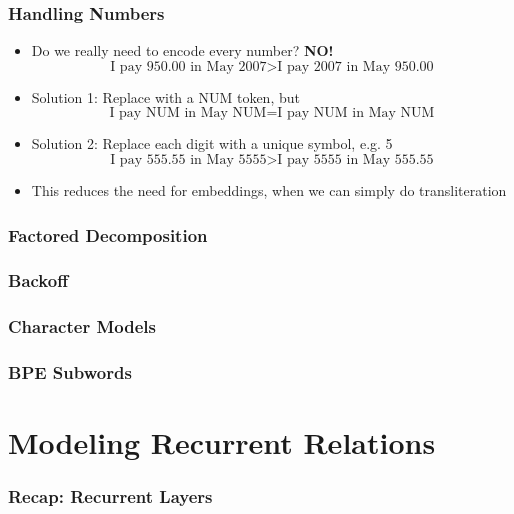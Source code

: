 \documentclass{beamer}
\begin{document}
\begin{frame}
\frametitle{Handling Numbers}
\begin{itemize}
  \item Do we really need to encode every number? \textbf{NO!}
  \begin{equation*}
    \text{I pay 950.00 in May 2007} > \text{I pay 2007 in May 950.00}
  \end{equation*}
  \pause
  \item Solution 1: Replace with a NUM token, but
  \begin{equation*}
    \text{I pay NUM in May NUM} = \text{I pay NUM in May NUM}
  \end{equation*}
  \pause
  \item Solution 2: Replace each digit with a unique symbol, e.g. 5
  \begin{equation*}
    \text{I pay 555.55 in May 5555} > \text{I pay 5555 in May 555.55}
  \end{equation*}
  \item This reduces the need for embeddings, when we can simply do transliteration
\end{itemize}
\end{frame}

\begin{frame}
\frametitle{Factored Decomposition}

\end{frame}



\begin{frame}
\frametitle{Backoff}

\end{frame}



\begin{frame}
\frametitle{Character Models}

\end{frame}



\begin{frame}
\frametitle{BPE Subwords}

\end{frame}


\section{Modeling Recurrent Relations}

\begin{frame}
\frametitle{Recap: Recurrent Layers}

\end{frame}
\end{document}
